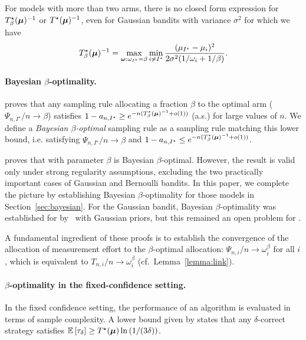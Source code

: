 For models with more than two arms, there is no closed form expression for $T_{\beta}^\star({\boldsymbol \mu})^{-1}$ or $T^\star({\boldsymbol \mu})^{-1}$, even for Gaussian bandits  with variance $\sigma^2$ for which we have
\[
    T_{\beta}^\star({\boldsymbol \mu})^{-1} = \max_{{\boldsymbol \omega}:\omega_{I^\star}=\beta}\min_{i\neq I^\star} \frac{(\mu_{I^\star}-\mu_i)^2}{2\sigma^2(1/\omega_i+1/\beta)}.
\]


\paragraph{Bayesian \texorpdfstring{$\beta$}{}-optimality.} \citet{russo2016ttts} proves that  any sampling rule allocating a fraction $\beta$ to the optimal arm ($\Psi_{n,I^\star}/n \rightarrow \beta$) satisfies %
$1-a_{n, I^\star} \geq e^{-n(T_{\beta}^\star({\boldsymbol \mu})^{-1} + o(1))}$ (a.s.) for large values of $n$. We define a  \emph{Bayesian $\beta$-optimal} sampling rule as a sampling rule matching this lower bound, i.e. satisfying $\Psi_{n,I^\star}/n \rightarrow \beta$ and $1- a_{n, I^\star} \leq e^{-n(T_{\beta}^\star({\boldsymbol \mu})^{-1} + o(1))}$.

\citet{russo2016ttts} proves that \TTTS with parameter $\beta$ is Bayesian $\beta$-optimal.
However, the result is valid only under strong regularity assumptions, excluding the two practically important cases of Gaussian and Bernoulli bandits. In this paper, we complete the picture by establishing Bayesian $\beta$-optimality for those models in Section~\ref{sec:bayesian}. For the Gaussian bandit, Bayesian $\beta$-optimality was established for \TTEI by~\cite{qin2017ttei} with Gaussian priors, but this remained an open problem for \TTTS.

A fundamental ingredient of these proofs is to establish the convergence of the allocation of measurement effort to the $\beta$-optimal allocation: $\Psi_{n,i}/n \rightarrow \omega_{i}^\beta$ for all $i$, which is equivalent to $T_{n,i}/n \rightarrow \omega_{i}^\beta$ (cf.\ Lemma~\ref{lemma:link}).

\paragraph{\texorpdfstring{$\beta$}{}-optimality in the fixed-confidence setting.} In the fixed confidence setting, the performance of an algorithm is evaluated in terms of sample complexity. A lower bound given by \cite{garivier2016tracknstop} states that any $\delta$-correct strategy satisfies $\mathbb{E}\left[\tau_\delta\right] \geq T^\star({\boldsymbol \mu}) \ln \left({1}/(3\delta)\right)$. 

